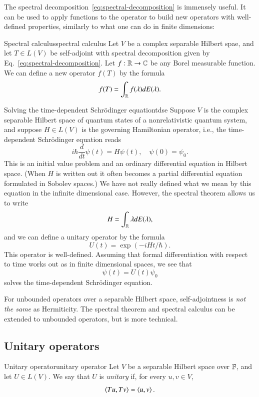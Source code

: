 The spectral decomposition~\ref{eq:spectral-decomposition} is immensely useful. It can be used to apply functions to the operator to build new operators with well-defined properties, similarly to what one can do in finite dimensions:
\begin{myTheorem}{Spectral calculus}{spectral calculus}
    Let $V$ be a complex separable Hilbert spae, and let $T \in L(V)$ be self-adjoint with spectral decomposition given by Eq.~\eqref{eq:spectral-decomposition}. Let $f : \mathbb{R} \to \mathbb{C}$ be any Borel measurable function. We can define a new operator $f(T)$ by the formula
    \begin{equation}
        f(T) = \int_{\mathbb{R}} f(\lambda) dE(\lambda).
    \end{equation}
\end{myTheorem}

\begin{myExample}{Solving the time-dependent Schrödinger equation}{tdse}
    Suppose $V$ is the complex separable Hilbert space of quantum states of a nonrelativistic quantum system, and suppose $H \in L(V)$ is the governing Hamiltonian operator, i.e., the time-dependent Schrödinger equation reads
    $$ i\hbar \frac{d}{dt} \psi(t) = H\psi(t), \quad \psi(0) = \psi_0. $$
    This is an initial value problem and an ordinary differential equation in Hilbert space. (When $H$ is written out it often becomes a partial differential equation formulated in Sobolev spaces.)
    We have not really defined what we mean by this equation in the infinite dimensional case. However,  the spectral theorem allows us to write
    $$ H = \int_{\mathbb{R}} \lambda dE(\lambda), $$
    and we can define a unitary operator by the formula
    $$ U(t) = \exp(-iH t/\hbar). $$
    This operator is well-defined.    Assuming that formal differentiation with respect to time works out as in finite dimensional spaces, we see that
    $$ \psi(t) = U(t)\psi_0 $$
    solves the time-dependent Schrödinger equation.
\end{myExample}


For unbounded operators over a separable Hilbert space, self-adjointness is \emph{not the same} as Hermiticity. The spectral theorem and spectral calculus can be extended to unbounded operators, but is more technical.


\subsection{Unitary operators}

\begin{myDefinition}{Unitary operator}{unitary operator}
    Let $V$ be a separable Hilbert space over $\mathbb{F}$, and let $U \in L(V)$. We say that $U$ is \emph{unitary} if, for every $u,v\in V$,
    $$ \braket{Tu,Tv} = \braket{u,v}. $$
\end{myDefinition}

